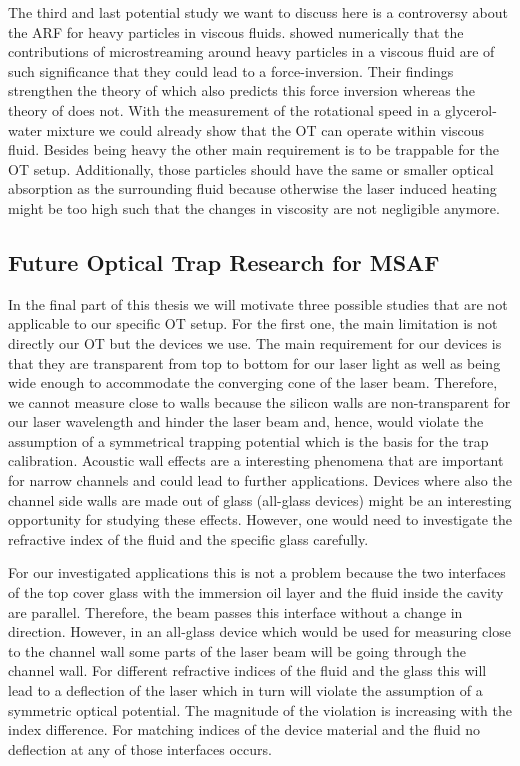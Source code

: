 The third and last potential study we want to discuss here is a controversy 
about the ARF for heavy particles in viscous fluids.  showed 
numerically that the contributions of microstreaming around heavy particles in 
a viscous fluid are of such significance that they could lead to a 
force-inversion. Their findings strengthen the theory of 
 which also predicts this force inversion whereas the 
theory of  does not. With the measurement of the rotational 
speed in a glycerol-water mixture we could already show that the OT can operate 
within viscous fluid. Besides being heavy the other main requirement is to be 
trappable for the OT setup. Additionally, those particles should have the same 
or smaller optical absorption as the surrounding fluid because otherwise the 
laser induced heating might be too high such that the changes in viscosity are 
not negligible anymore.

\subsection{Future Optical Trap Research for MSAF}

In the final part of this thesis we will motivate three possible studies that 
are not applicable to our specific OT setup. For the first one, the main 
limitation is not directly our OT but the devices we use. The main requirement 
for our devices is that they are transparent from top to bottom for our laser 
light as well as being wide enough to accommodate the converging cone of the 
laser beam. Therefore, we cannot measure close to walls because the silicon 
walls are non-transparent for our laser wavelength and hinder the laser beam 
and, hence, would violate the assumption of a symmetrical trapping potential 
which is the basis for the trap calibration. Acoustic wall effects are a 
interesting phenomena that are important for narrow channels and could lead to 
further applications. Devices where also the channel side walls are made out of 
glass (all-glass devices) might be an interesting opportunity for studying 
these effects. However, one would need to investigate the refractive index of 
the fluid and the specific glass carefully.

For our investigated applications this is not a problem because the two 
interfaces of the top cover glass with the immersion oil layer and the fluid 
inside the cavity are parallel. Therefore, the beam passes this interface 
without a change in direction. However, in an all-glass device which would be 
used for measuring close to the channel wall some parts of the laser beam will 
be going through the channel wall. For different refractive indices of the 
fluid and the glass this will lead to a deflection of the laser which in turn 
will violate the assumption of a symmetric optical potential. The magnitude of 
the violation is increasing with the index difference. For matching indices of 
the device material and the fluid no deflection at any of those interfaces 
occurs.

